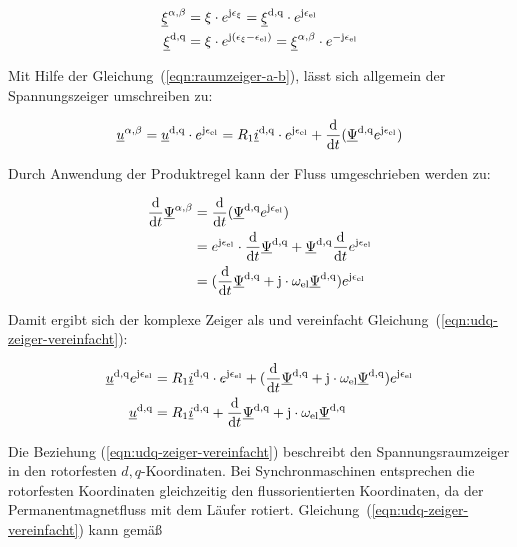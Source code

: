 \begin{align}
	\underline{\xi}^{\alpha,\beta} &= \xi \cdot e^{\mathrm{j}\epsilon_\xi} = \underline{\xi}^{\mathrm{d,q}}\cdot e^{\mathrm{j}\epsilon_{\mathrm{el}}} \label{eqn:raumzeiger-a-b}\\
	\underline{\xi}^{\mathrm{d,q}} &= \xi \cdot e^{\mathrm{j}(\epsilon_\xi - \epsilon_{\mathrm{el}})} = \underline{\xi}^{\alpha,\beta} \cdot e^{-\mathrm{j}\epsilon_{\mathrm{el}}}
\end{align}

Mit Hilfe der Gleichung~(\ref{eqn:raumzeiger-a-b}), lässt sich allgemein der Spannungszeiger umschreiben zu:

\begin{align}
	\underline{u}^{\alpha,\beta} = \underline{u}^{\mathrm{d,q}}\cdot e^{\mathrm{j}\epsilon_{\mathrm{el}}} = R_{\mathrm{1}}\underline{i}^{\mathrm{d,q}}\cdot e^{\mathrm{j}\epsilon_{\mathrm{el}}} + \frac{\mathrm{d}}{\mathrm{d}t}(\underline{\Psi}^{\mathrm{d,q}}e^{\mathrm{j}\epsilon_{\mathrm{el}}})
\end{align}

Durch Anwendung der Produktregel kann der Fluss umgeschrieben werden zu:

\begin{align}
	\frac{\mathrm{d}}{\mathrm{d}t}\underline{\Psi}^{\alpha,\beta} &= \frac{\mathrm{d}}{\mathrm{d}t}(\underline{\Psi}^{\mathrm{d,q}}e^{\mathrm{j}\epsilon_{\mathrm{el}}}) \nonumber \\
														&= e^{\mathrm{j}\epsilon_{\mathrm{el}}} \cdot \frac{\mathrm{d}}{\mathrm{d}t}\underline{\Psi}^{\mathrm{d,q}} + \underline{\Psi}^{\mathrm{d,q}} \frac{\mathrm{d}}{\mathrm{d}t}e^{\mathrm{j}\epsilon_{\mathrm{el}}} \\
														&= (\frac{\mathrm{d}}{\mathrm{d}t}\underline{\Psi}^{\mathrm{d,q}}+\mathrm{j}\cdot \omega_{\mathrm{el}}\underline{\Psi}^{\mathrm{d,q}})e^{\mathrm{j}\epsilon_{\mathrm{el}}}
\end{align}

Damit ergibt sich der komplexe Zeiger als und vereinfacht Gleichung~(\ref{eqn:udq-zeiger-vereinfacht}):

\begin{align}
	\underline{u}^{\mathrm{d,q}}e^{\mathrm{j}\epsilon_{\mathrm{el}}} &= R_{\mathrm{1}}\underline{i}^{\mathrm{d,q}}\cdot e^{\mathrm{j}\epsilon_{\mathrm{el}}} + (\frac{\mathrm{d}}{\mathrm{d}t}\underline{\Psi}^{\mathrm{d,q}}+\mathrm{j}\cdot \omega_{\mathrm{el}}\underline{\Psi}^{\mathrm{d,q}})e^{\mathrm{j}\epsilon_{\mathrm{el}}}\\
	\underline{u}^{\mathrm{d,q}} &= R_{\mathrm{1}}\underline{i}^{\mathrm{d,q}} + \frac{\mathrm{d}}{\mathrm{d}t}\underline{\Psi}^{\mathrm{d,q}}+\mathrm{j}\cdot \omega_{\mathrm{el}}\underline{\Psi}^{\mathrm{d,q}}	  \label{eqn:udq-zeiger-vereinfacht}
\end{align}

Die Beziehung (\ref{eqn:udq-zeiger-vereinfacht}) beschreibt den Spannungsraumzeiger in den rotorfesten $d,q$-Koordinaten.
Bei Synchronmaschinen entsprechen die rotorfesten Koordinaten gleichzeitig den flussorientierten Koordinaten, da der Permanentmagnetfluss mit dem Läufer rotiert.
Gleichung~(\ref{eqn:udq-zeiger-vereinfacht}) kann gemäß

